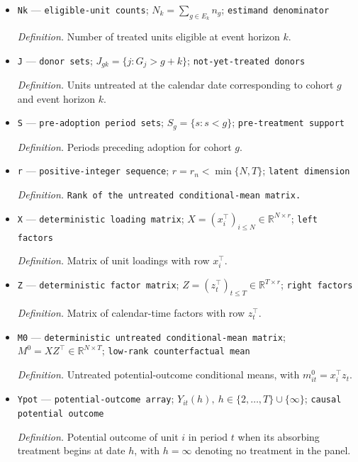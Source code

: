 \documentclass{article}
\begin{document}
\begin{itemize}
  \item \texttt{Nk} --- \texttt{eligible-\allowbreak{}unit counts}; \(N_k=\sum_{g\in E_k}n_g\); \texttt{estimand denominator}
  \par\smallskip\noindent\emph{Definition.} Number of treated units eligible at event horizon \(k\).
  \item \texttt{J} --- \texttt{donor sets}; \(J_{gk}=\{j:G_j>g+k\}\); \texttt{not-\allowbreak{}yet-\allowbreak{}treated donors}
  \par\smallskip\noindent\emph{Definition.} Units untreated at the calendar date corresponding to cohort \(g\) and event horizon \(k\).
  \item \texttt{S} --- \texttt{pre-\allowbreak{}adoption period sets}; \(S_g=\{s:s<g\}\); \texttt{pre-\allowbreak{}treatment support}
  \par\smallskip\noindent\emph{Definition.} Periods preceding adoption for cohort \(g\).
  \item \texttt{r} --- \texttt{positive-\allowbreak{}integer sequence}; \(r=r_n<\min\{N,T\}\); \texttt{latent dimension}
  \par\smallskip\noindent\emph{Definition.} \texttt{Rank of the untreated conditional-\allowbreak{}mean matrix.}
  \item \texttt{X} --- \texttt{deterministic loading matrix}; \(X=(x_i^\top)_{i\le N}\in\mathbb R^{N\times r}\); \texttt{left factors}
  \par\smallskip\noindent\emph{Definition.} Matrix of unit loadings with row \(x_i^\top\).
  \item \texttt{Z} --- \texttt{deterministic factor matrix}; \(Z=(z_t^\top)_{t\le T}\in\mathbb R^{T\times r}\); \texttt{right factors}
  \par\smallskip\noindent\emph{Definition.} Matrix of calendar-time factors with row \(z_t^\top\).
  \item \texttt{M0} --- \texttt{deterministic untreated conditional-\allowbreak{}mean matrix}; \(M^0=XZ^\top\in\mathbb R^{N\times T}\); \texttt{low-\allowbreak{}rank counterfactual mean}
  \par\smallskip\noindent\emph{Definition.} Untreated potential-outcome conditional means, with \(m^0_{it}=x_i^\top z_t\).
  \item \texttt{Ypot} --- \texttt{potential-\allowbreak{}outcome array}; \(Y_{it}(h),\ h\in\{2,\ldots,T\}\cup\{\infty\}\); \texttt{causal potential outcome}
  \par\smallskip\noindent\emph{Definition.} Potential outcome of unit \(i\) in period \(t\) when its absorbing treatment begins at date \(h\), with \(h=\infty\) denoting no treatment in the panel.

\end{itemize}
\end{document}
